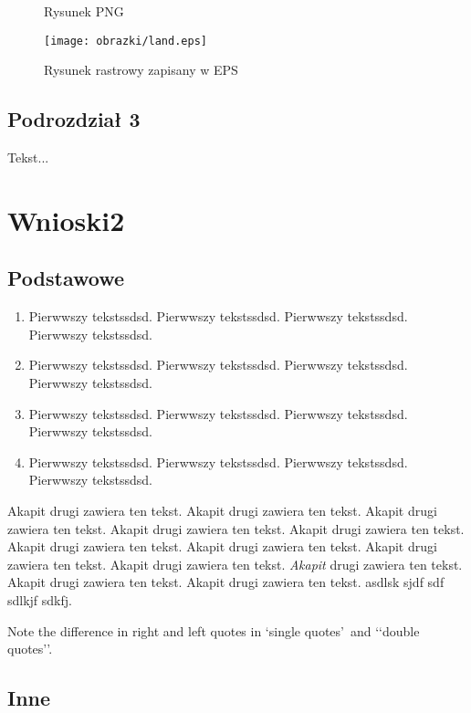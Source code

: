 \begin{figure}[htb]
\centering
{}
\caption{Rysunek PNG}
\label{rysKrajobraz}
\end{figure}

\begin{figure}[htb]
\centering
\texttt{[image: obrazki/land.eps]}
\caption{Rysunek rastrowy zapisany w EPS}
\label{rysKrajobraz2}
\end{figure}

\subsection{Podrozdział 3}

Tekst...


\rozdzial
\section {Wnioski2}

\subsection {Podstawowe}

\begin{enumerate}
\item Pierwwszy tekstssdsd. Pierwwszy tekstssdsd. Pierwwszy tekstssdsd. Pierwwszy tekstssdsd.
\item Pierwwszy tekstssdsd. Pierwwszy tekstssdsd. Pierwwszy tekstssdsd. Pierwwszy tekstssdsd.
\item Pierwwszy tekstssdsd. Pierwwszy tekstssdsd. Pierwwszy tekstssdsd. Pierwwszy tekstssdsd.
\item Pierwwszy tekstssdsd. Pierwwszy tekstssdsd. Pierwwszy tekstssdsd. Pierwwszy tekstssdsd.
\end{enumerate}

Akapit drugi zawiera ten tekst. Akapit drugi zawiera ten tekst. Akapit drugi zawiera ten tekst.
Akapit drugi zawiera ten tekst. Akapit drugi zawiera ten tekst. Akapit drugi zawiera ten tekst.
Akapit drugi zawiera ten tekst. Akapit drugi zawiera ten tekst. Akapit drugi zawiera ten tekst.
\emph{Akapit} drugi zawiera ten tekst. Akapit drugi zawiera ten tekst. Akapit drugi zawiera ten tekst.
asdlsk sjdf sdf sdlkjf sdkfj.

Note the difference in right and left quotes in \lq single
quotes\rq\ and \lq\lq double quotes\rq\rq.

\subsection {Inne}


